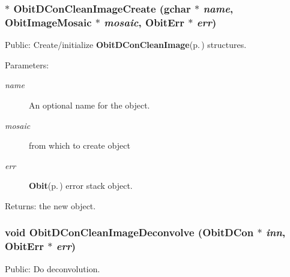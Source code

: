 \subsubsection{$\ast$ Obit\-DCon\-Clean\-Image\-Create (gchar $\ast$ {\em name}, {\bf Obit\-Image\-Mosaic} $\ast$ {\em mosaic}, {\bf Obit\-Err} $\ast$ {\em err})}\label{ObitDConCleanImage_8c_a11}


Public: Create/initialize {\bf Obit\-DCon\-Clean\-Image}{\rm (p.\,\pageref{structObitDConCleanImage})} structures. 

\begin{Desc}
\item[Parameters:]
\begin{description}
\item[{\em name}]An optional name for the object. \item[{\em mosaic}]from which to create object \item[{\em err}]{\bf Obit}{\rm (p.\,\pageref{structObit})} error stack object. \end{description}
\end{Desc}
\begin{Desc}
\item[Returns:]the new object. \end{Desc}
\subsubsection{\setlength{\rightskip}{0pt plus 5cm}void Obit\-DCon\-Clean\-Image\-Deconvolve ({\bf Obit\-DCon} $\ast$ {\em inn}, {\bf Obit\-Err} $\ast$ {\em err})}\label{ObitDConCleanImage_8c_a12}


Public: Do deconvolution. 


